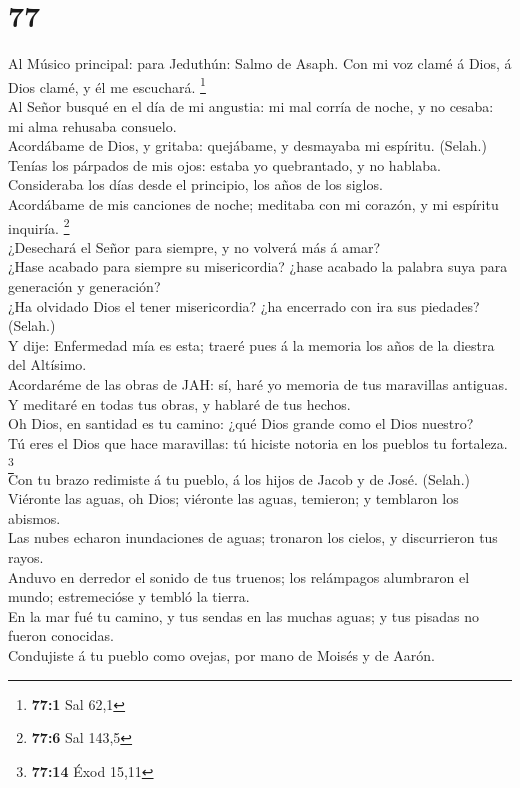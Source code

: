 \hypertarget{section-76}{%
\section{77}\label{section-76}}

 Al Músico principal: para Jeduthún: Salmo de Asaph. Con mi
voz clamé á Dios, á Dios clamé, y él me escuchará. \footnote{\textbf{77:1}
  Sal 62,1}\\
 Al Señor busqué en el día de mi angustia: mi mal corría de
noche, y no cesaba: mi alma rehusaba consuelo.\\
 Acordábame de Dios, y gritaba: quejábame, y desmayaba mi
espíritu. (Selah.)\\
 Tenías los párpados de mis ojos: estaba yo quebrantado, y
no hablaba.\\
 Consideraba los días desde el principio, los años de los
siglos.\\
 Acordábame de mis canciones de noche; meditaba con mi
corazón, y mi espíritu inquiría. \footnote{\textbf{77:6} Sal 143,5}\\
 ¿Desechará el Señor para siempre, y no volverá más á
amar?\\
 ¿Hase acabado para siempre su misericordia? ¿hase acabado
la palabra suya para generación y generación?\\
 ¿Ha olvidado Dios el tener misericordia? ¿ha encerrado con
ira sus piedades? (Selah.)\\
 Y dije: Enfermedad mía es esta; traeré pues á la memoria
los años de la diestra del Altísimo.\\
 Acordaréme de las obras de JAH: sí, haré yo memoria de tus
maravillas antiguas.\\
 Y meditaré en todas tus obras, y hablaré de tus hechos.\\
 Oh Dios, en santidad es tu camino: ¿qué Dios grande como
el Dios nuestro?\\
 Tú eres el Dios que hace maravillas: tú hiciste notoria en
los pueblos tu fortaleza. \footnote{\textbf{77:14} Éxod 15,11}\\
 Con tu brazo redimiste á tu pueblo, á los hijos de Jacob y
de José. (Selah.)\\
 Viéronte las aguas, oh Dios; viéronte las aguas, temieron;
y temblaron los abismos.\\
 Las nubes echaron inundaciones de aguas; tronaron los
cielos, y discurrieron tus rayos.\\
 Anduvo en derredor el sonido de tus truenos; los
relámpagos alumbraron el mundo; estremecióse y tembló la tierra.\\
 En la mar fué tu camino, y tus sendas en las muchas aguas;
y tus pisadas no fueron conocidas.\\
 Condujiste á tu pueblo como ovejas, por mano de Moisés y
de Aarón.

